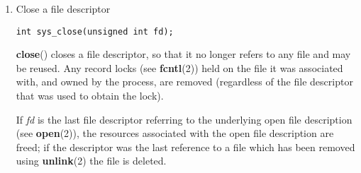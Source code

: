 \documentclass[twoside]{article}
\begin{document}
\begin{multicols}{2}
\begin{enumerate}
Given a
{\it pathname}
for a file,
{\bf open}{\rm ()}
returns a file descriptor, a small, nonnegative integer
for use in subsequent system calls
{\rm (}{\bf read}{\rm (2),\ }{\bf write}{\rm (2),\ }{\bf lseek}{\rm (2),\ }{\bf fcntl}{\rm (2),\ etc.).}
The file descriptor returned by a successful call will be
the lowest-numbered file descriptor not currently open for the process.
\par
By default, the new file descriptor is set to remain open across an
{\bf execve}{\rm (2)}
(i.e., the
{\bf FD\_CLOEXEC}
file descriptor flag described in
{\bf fcntl}{\rm (2)}
is initially disabled; the
{\bf O\_CLOEXEC}
flag, described below, can be used to change this default).
The file offset is set to the beginning of the file (see
{\bf lseek}{\rm (2)).}
\par
A call to
{\bf open}{\rm ()}
creates a new
{\it open\ file\ description}{\rm ,}
an entry in the system-wide table of open files.
This entry records the file offset and the file status flags
(modifiable via the
{\bf fcntl}{\rm (2)}
{\bf F\_SETFL}
operation).
A file descriptor is a reference to one of these entries;
this reference is unaffected if
{\it pathname}
is subsequently removed or modified to refer to a different file.
The new open file description is initially not shared
with any other process,
but sharing may arise via
{\bf fork}{\rm (2).}
\par
The argument
{\it flags}
must include one of the following
{\it access\ modes}{\rm :}
{\bf O\_RDONLY}{\rm ,\ }{\bf O\_WRONLY}{\rm ,\ or\ }{\bf O\_RDWR}{\rm .}
These request opening the file read-only, write-only, or read/write,
respectively.


\item
Close a file descriptor
{\footnotesize
\begin{lstlisting}
int sys_close(unsigned int fd);
\end{lstlisting}
\par}

{\bf close}{\rm ()}
closes a file descriptor, so that it no longer refers to any file and
may be reused.
Any record locks (see
{\bf fcntl}{\rm (2))}
held on the file it was associated with,
and owned by the process, are removed (regardless of the file
descriptor that was used to obtain the lock).
\par
If
{\it fd}
is the last file descriptor referring to the underlying
open file description (see
{\bf open}{\rm (2)),}
the resources associated with the open file description are freed;
if the descriptor was the last reference to a file which has been
removed using
{\bf unlink}{\rm (2)}
the file is deleted.


\end{enumerate}
\end{multicols}
\end{document}
